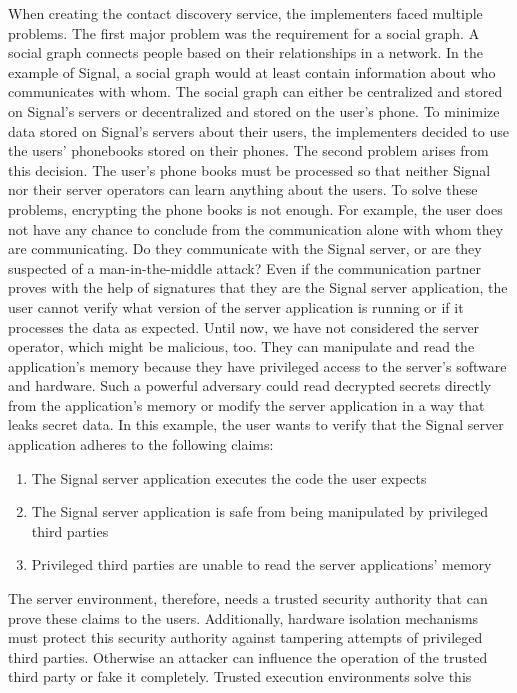 When creating the contact discovery service, the implementers faced multiple
problems. The first major problem was the requirement for a social graph. A
social graph connects people based on their relationships in a network. In the
example of Signal, a social graph would at least contain information about who
communicates with whom. The social graph can either be centralized and stored on
Signal's servers or decentralized and stored on the user's phone. To minimize
data stored on Signal's servers about their users, the implementers decided to
use the users' phonebooks stored on their phones. The second problem arises from
this decision. The user's phone books must be processed so that neither Signal
nor their server operators can learn anything about the users. To solve these
problems, encrypting the phone books is not enough. For example, the user does
not have any chance to conclude from the communication alone with whom they are
communicating. Do they communicate with the Signal server, or are they suspected
of a man-in-the-middle attack? Even if the communication partner proves with the
help of signatures that they are the Signal server application, the user cannot
verify what version of the server application is running or if it processes the
data as expected. Until now, we have not considered the server operator, which
might be malicious, too. They can manipulate and read the application's memory
because they have privileged access to the server's software and hardware. Such
a powerful adversary could read decrypted secrets directly from the
application's memory or modify the server application in a way that leaks secret
data. In this example, the user wants to verify that the Signal server
application adheres to the following claims:
\begin{enumerate}
    \item The Signal server application executes the code the user expects
    \item The Signal server application is safe from being manipulated by
          privileged third parties
    \item Privileged third parties are unable to read the server applications'
          memory
\end{enumerate}
The server environment, therefore, needs a trusted security authority that can
prove these claims to the users. Additionally, hardware isolation mechanisms
must protect this security authority against tampering attempts of privileged
third parties. Otherwise an attacker can influence the operation of the trusted
third party or fake it completely. Trusted execution environments solve this
